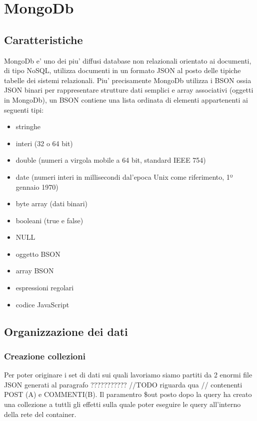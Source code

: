 \chapter{MongoDb}

\section{Caratteristiche}

MongoDb e' uno dei piu' diffusi database non relazionali orientato ai documenti, di tipo NoSQL,  utilizza documenti in un formato JSON al posto delle tipiche tabelle 
dei sistemi relazionali. Piu' precisamente MongoDb utilizza i BSON ossia JSON binari per rappresentare strutture dati semplici e array associativi (oggetti in MongoDb),
un BSON contiene una lista ordinata di elementi appartenenti ai seguenti tipi:

\begin{itemize}{}{}
    \item stringhe
    \item interi (32 o 64 bit)
    \item double (numeri a virgola mobile a 64 bit, standard IEEE 754)
    \item date (numeri interi in millisecondi dal'epoca Unix come riferimento, 1º gennaio 1970)
    \item byte array (dati binari)
    \item booleani (true e false)
    \item NULL
    \item oggetto BSON
    \item array BSON
    \item espressioni regolari
    \item codice JavaScript
\end{itemize}

\section{Organizzazione dei dati}

\subsection{Creazione collezioni}

Per poter originare i set di dati sui quali lavoriamo siamo partiti da 2 enormi file JSON generati al paragrafo ??????????? //TODO riguarda qua //
contenenti POST (A) e COMMENTI(B). Il paramentro \$out posto dopo la query ha creato una collezione a tuttli gli effetti sulla quale poter eseguire le query
all'interno della rete del container.

